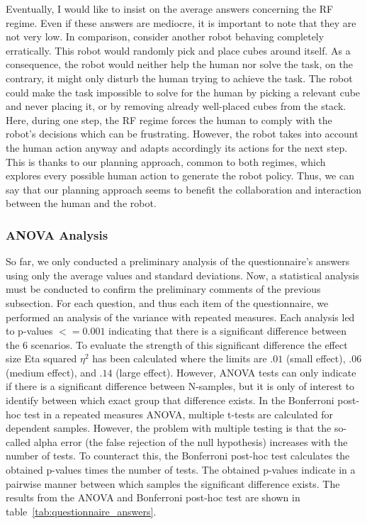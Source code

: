 Eventually, I would like to insist on the average answers concerning the RF regime. Even if these answers are mediocre, it is important to note that they are not very low. In comparison, consider another robot behaving completely erratically. This robot would randomly pick and place cubes around itself. As a consequence, the robot would neither help the human nor solve the task, on the contrary, it might only disturb the human trying to achieve the task. The robot could make the task impossible to solve for the human by picking a relevant cube and never placing it, or by removing already well-placed cubes from the stack. Here, during one step, the RF regime forces the human to comply with the robot's decisions which can be frustrating. However, the robot takes into account the human action anyway and adapts accordingly its actions for the next step. This is thanks to our planning approach, common to both regimes, which explores every possible human action to generate the robot policy. Thus, we can say that our planning approach seems to benefit the collaboration and interaction between the human and the robot.

\subsubsection{ANOVA Analysis}

So far, we only conducted a preliminary analysis of the questionnaire's answers using only the average values and standard deviations. Now, a statistical analysis must be conducted to confirm the preliminary comments of the previous subsection. For each question, and thus each item of the questionnaire, we performed an analysis of the variance with repeated measures. Each analysis led to p-values $<=0.001$ indicating that there is a significant difference between the 6 scenarios. To evaluate the strength of this significant difference the effect size Eta squared $\eta^2$ has been calculated where the limits are $.01$ (small effect), $.06$ (medium effect), and $.14$ (large effect). However, ANOVA tests can only indicate if there is a significant difference between N-samples, but it is only of interest to identify between which exact group that difference exists.  In the Bonferroni post-hoc test in a repeated measures ANOVA, multiple t-tests are calculated for dependent samples. However, the problem with multiple testing is that the so-called alpha error (the false rejection of the null hypothesis) increases with the number of tests. To counteract this, the Bonferroni post-hoc test calculates the obtained p-values times the number of tests. The obtained p-values indicate in a pairwise manner between which samples the significant difference exists. The results from the ANOVA and Bonferroni post-hoc test are shown in table~\ref{tab:questionnaire_answers}.

